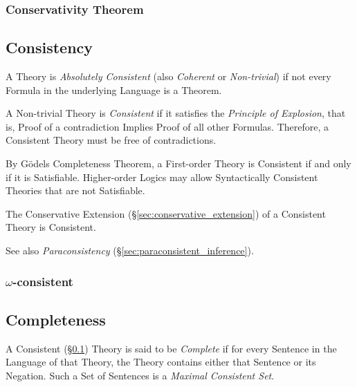 \subsubsection{Conservativity Theorem}\label{sec:conservativity_theorem}



\subsection{Consistency}\label{sec:consistency}

A Theory is \emph{Absolutely Consistent} (also \emph{Coherent} or
\emph{Non-trivial}) if not every Formula in the underlying Language is
a Theorem.

A Non-trivial Theory is \emph{Consistent} if it satisfies the
\emph{Principle of Explosion}, that is, Proof of a contradiction
Implies Proof of all other Formulas. Therefore, a Consistent Theory must
be free of contradictions.

By G\"odels Completeness Theorem, a First-order Theory is Consistent
if and only if it is Satisfiable. Higher-order Logics may allow
Syntactically Consistent Theories that are not Satisfiable.

The Conservative Extension (\S\ref{sec:conservative_extension}) of a
Consistent Theory is Consistent.

See also \emph{Paraconsistency} (\S\ref{sec:paraconsistent_inference}).



\subsubsection{$\omega$-consistent}\label{sec:omega_consistent}



\subsection{Completeness}\label{sec:completeness}

A Consistent (\S\ref{sec:consistency}) Theory is said to be
\emph{Complete} if for every Sentence in the Language of that Theory,
the Theory contains either that Sentence or its Negation. Such a Set
of Sentences is a \emph{Maximal Consistent Set}.



